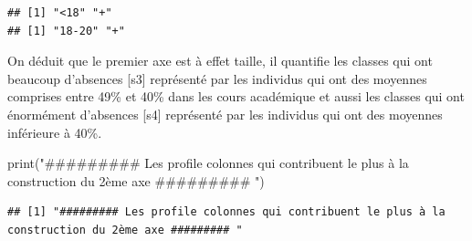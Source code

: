 \documentclass[
]{article}
\newenvironment{Shaded}{\begin{snugshade}}{\end{snugshade}}
\newcommand{\AttributeTok}[1]{\textcolor[rgb]{0.77,0.63,0.00}{#1}}
\newcommand{\ControlFlowTok}[1]{\textcolor[rgb]{0.13,0.29,0.53}{\textbf{#1}}}
\newcommand{\DecValTok}[1]{\textcolor[rgb]{0.00,0.00,0.81}{#1}}
\newcommand{\FunctionTok}[1]{\textcolor[rgb]{0.00,0.00,0.00}{#1}}
\newcommand{\NormalTok}[1]{#1}
\newcommand{\OtherTok}[1]{\textcolor[rgb]{0.56,0.35,0.01}{#1}}
\newcommand{\SpecialCharTok}[1]{\textcolor[rgb]{0.00,0.00,0.00}{#1}}
\newcommand{\StringTok}[1]{\textcolor[rgb]{0.31,0.60,0.02}{#1}}
\begin{document}
\begin{verbatim}
## [1] "<18" "+"  
## [1] "18-20" "+"
\end{verbatim}

On déduit que le premier axe est à effet taille, il quantifie les
classes qui ont beaucoup d'absences {[}s3{]} représenté par les
individus qui ont des moyennes comprises entre 49\% et 40\% dans les
cours académique et aussi les classes qui ont énormément d'absences
{[}s4{]} représenté par les individus qui ont des moyennes inférieure à
40\%.

\begin{Shaded}
\begin{Highlighting}[]
\FunctionTok{print}\NormalTok{(}\StringTok{"\#\#\#\#\#\#\#\#\# Les profile colonnes qui contribuent le plus à la construction du 2ème axe \#\#\#\#\#\#\#\#\# "}\NormalTok{)}
\end{Highlighting}
\end{Shaded}

\begin{verbatim}
## [1] "######### Les profile colonnes qui contribuent le plus à la construction du 2ème axe ######### "
\end{verbatim}

\begin{Shaded}
\end{Shaded}
\end{document}
